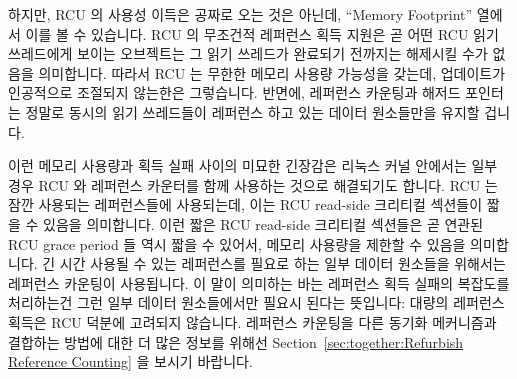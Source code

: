 하지만, RCU 의 사용성 이득은 공짜로 오는 것은 아닌데, ``Memory Footprint''
열에서 이를 볼 수 있습니다.
RCU 의 무조건적 레퍼런스 획득 지원은 곧 어떤 RCU 읽기 쓰레드에게 보이는
오브젝트는 그 읽기 쓰레드가 완료되기 전까지는 해제시킬 수가 없음을 의미합니다.
따라서 RCU 는 무한한 메모리 사용량 가능성을 갖는데, 업데이트가 인공적으로
조절되지 않는한은 그렇습니다.
반면에, 레퍼런스 카운팅과 해저드 포인터는 정말로 동시의 읽기 쓰레드들이
레퍼런스 하고 있는 데이터 원소들만을 유지할 겁니다.
\iffalse

However, RCU's ease-of-use advantage does not come
for free, as can be seen in the ``Memory Footprint'' row.
RCU's support of unconditional reference acquisition means that
it must avoid freeing any object visible to a given RCU reader
until that reader completes.
RCU therefore has an unbounded footprint, at least unless updates
are artificially throttled.
In contrast, reference counting and hazard pointers would retain only
those specific data elements actually referenced by concurrent readers.
\fi

이런 메모리 사용량과 획득 실패 사이의 미묘한 긴장감은 리눅스
커널 안에서는 일부 경우 RCU 와 레퍼런스 카운터를 함께 사용하는 것으로
해결되기도 합니다.
RCU 는 잠깐 사용되는 레퍼런스들에 사용되는데, 이는 RCU read-side 크리티컬
섹션들이 짧을 수 있음을 의미합니다.
이런 짧은 RCU read-side 크리티컬 섹션들은 곧 연관된 RCU grace period 들 역시
짧을 수 있어서, 메모리 사용량을 제한할 수 있음을 의미합니다.
긴 시간 사용될 수 있는 레퍼런스를 필요로 하는 일부 데이터 원소들을 위해서는
레퍼런스 카운팅이 사용됩니다.
이 말이 의미하는 바는 레퍼런스 획득 실패의 복잡도를 처리하는건 그런 일부 데이터
원소들에서만 필요시 된다는 뜻입니다:  대량의 레퍼런스 획득은 RCU 덕분에
고려되지 않습니다.
레퍼런스 카운팅을 다른 동기화 메커니즘과 결합하는 방법에 대한 더 많은 정보를
위해선
Section~\ref{sec:together:Refurbish Reference Counting} 을 보시기 바랍니다.
\iffalse

This tension between memory footprint and acquisition
failures is sometimes resolved within the Linux kernel by combining use
of RCU and reference counters.
RCU is used for short-lived references, which means that RCU read-side
critical sections can be short.
These short RCU read-side critical sections in turn mean that the corresponding
RCU grace periods can also be short, limiting the memory footprint.
For the few data elements that need longer-lived references, reference
counting is used.
This means that the complexity of reference-acquisition failure only
needs to be dealt with for those few data elements:  The bulk of
the reference acquisitions are unconditional, courtesy of RCU.
See Section~\ref{sec:together:Refurbish Reference Counting}
for more information on combining reference counting with other
synchronization mechanisms.
\fi

